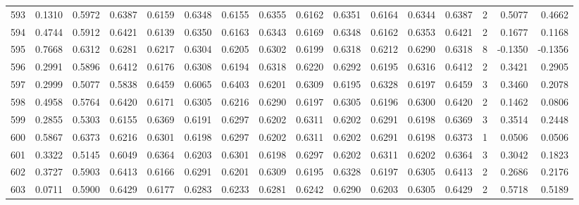 \begin{tabular}{lrrrrrrrrrrrrrrr}
593 &      0.1310 &  0.5972 &  0.6387 &  0.6159 &  0.6348 &  0.6155 &  0.6355 &  0.6162 &  0.6351 &  0.6164 &   0.6344 &     0.6387 &      2 &                    0.5077 &                     0.4662 \\
594 &      0.4744 &  0.5912 &  0.6421 &  0.6139 &  0.6350 &  0.6163 &  0.6343 &  0.6169 &  0.6348 &  0.6162 &   0.6353 &     0.6421 &      2 &                    0.1677 &                     0.1168 \\
595 &      0.7668 &  0.6312 &  0.6281 &  0.6217 &  0.6304 &  0.6205 &  0.6302 &  0.6199 &  0.6318 &  0.6212 &   0.6290 &     0.6318 &      8 &                   -0.1350 &                    -0.1356 \\
596 &      0.2991 &  0.5896 &  0.6412 &  0.6176 &  0.6308 &  0.6194 &  0.6318 &  0.6220 &  0.6292 &  0.6195 &   0.6316 &     0.6412 &      2 &                    0.3421 &                     0.2905 \\
597 &      0.2999 &  0.5077 &  0.5838 &  0.6459 &  0.6065 &  0.6403 &  0.6201 &  0.6309 &  0.6195 &  0.6328 &   0.6197 &     0.6459 &      3 &                    0.3460 &                     0.2078 \\
598 &      0.4958 &  0.5764 &  0.6420 &  0.6171 &  0.6305 &  0.6216 &  0.6290 &  0.6197 &  0.6305 &  0.6196 &   0.6300 &     0.6420 &      2 &                    0.1462 &                     0.0806 \\
599 &      0.2855 &  0.5303 &  0.6155 &  0.6369 &  0.6191 &  0.6297 &  0.6202 &  0.6311 &  0.6202 &  0.6291 &   0.6198 &     0.6369 &      3 &                    0.3514 &                     0.2448 \\
600 &      0.5867 &  0.6373 &  0.6216 &  0.6301 &  0.6198 &  0.6297 &  0.6202 &  0.6311 &  0.6202 &  0.6291 &   0.6198 &     0.6373 &      1 &                    0.0506 &                     0.0506 \\
601 &      0.3322 &  0.5145 &  0.6049 &  0.6364 &  0.6203 &  0.6301 &  0.6198 &  0.6297 &  0.6202 &  0.6311 &   0.6202 &     0.6364 &      3 &                    0.3042 &                     0.1823 \\
602 &      0.3727 &  0.5903 &  0.6413 &  0.6166 &  0.6291 &  0.6201 &  0.6309 &  0.6195 &  0.6328 &  0.6197 &   0.6305 &     0.6413 &      2 &                    0.2686 &                     0.2176 \\
603 &      0.0711 &  0.5900 &  0.6429 &  0.6177 &  0.6283 &  0.6233 &  0.6281 &  0.6242 &  0.6290 &  0.6203 &   0.6305 &     0.6429 &      2 &                    0.5718 &                     0.5189 \\

\end{tabular}
